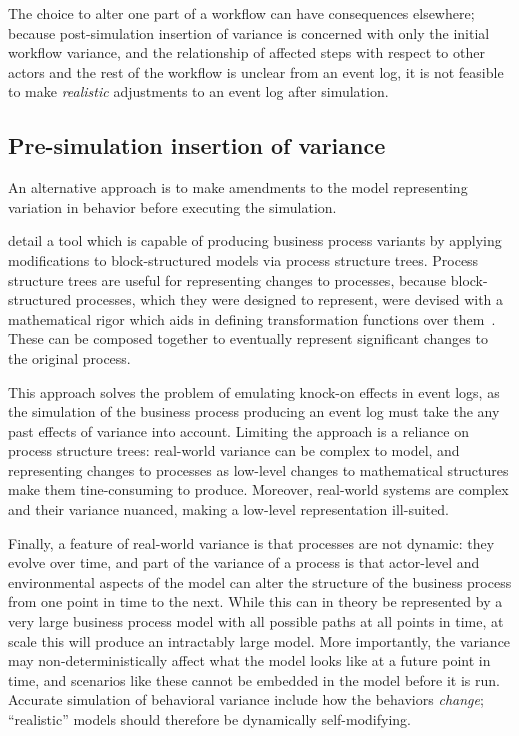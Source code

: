 \documentclass[12pt]{llncs}  %
\begin{document}
The choice to alter one part of a workflow can have consequences elsewhere;
because post-simulation insertion of variance is concerned with only the initial
workflow variance, and the relationship of affected steps with respect to other
actors and the rest of the workflow is unclear from an event log, it is not
feasible to make \emph{realistic} adjustments to an event log after simulation.
\par


\subsection{Pre-simulation insertion of variance}
An alternative approach is to make amendments to the model
representing variation in behavior before executing the simulation.
\par

\cite{pourmasoumi2015business} detail a tool which is capable of producing
business process variants by applying modifications to block-structured models
via process structure trees. Process structure trees are useful for representing
changes to processes, because block-structured processes, which they were
designed to represent, were devised with a mathematical rigor which aids in
defining transformation functions over them~\citep{li2010mining}. These can be composed together to
eventually represent significant changes to the original process.\par

This approach solves the problem of emulating knock-on effects in event logs, as
the simulation of the business process producing an event log must take the any
past effects of variance into account. Limiting the approach is a reliance on
process structure trees: real-world variance can be complex to model, and
representing changes to processes as low-level changes to mathematical
structures make them tine-consuming to produce. Moreover, real-world systems are
complex and their variance nuanced, making a low-level representation
ill-suited.
\par

Finally, a feature of real-world variance is that processes are not dynamic:
they evolve over time, and part of the variance of a process is that actor-level
and environmental aspects of the model can alter the structure of the business
process from one point in time to the next. While this can in theory be
represented by a very large business process model with all possible paths at
all points in time, at scale this will produce an intractably large model. More
importantly, the variance may non-deterministically affect what the model looks
like at a future point in time, and scenarios like these cannot be embedded in
the model before it is run. Accurate simulation of behavioral variance include
how the behaviors \emph{change}; ``realistic'' models should therefore be
dynamically self-modifying.
\par
\end{document}
